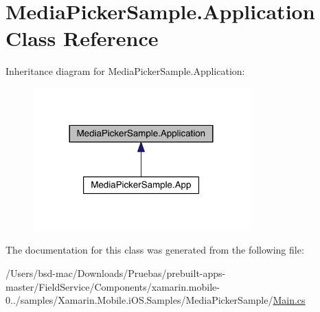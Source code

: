 \hypertarget{class_media_picker_sample_1_1_application}{\section{Media\+Picker\+Sample.\+Application Class Reference}
\label{class_media_picker_sample_1_1_application}
}


Inheritance diagram for Media\+Picker\+Sample.\+Application\+:
\nopagebreak
\begin{figure}[H]
\begin{center}
\leavevmode
\includegraphics[width=236pt]{class_media_picker_sample_1_1_application__inherit__graph}
\end{center}
\end{figure}


The documentation for this class was generated from the following file\+:\begin{DoxyCompactItemize}
\item 
/\+Users/bsd-\/mac/\+Downloads/\+Pruebas/prebuilt-\/apps-\/master/\+Field\+Service/\+Components/xamarin.\+mobile-\/0../samples/\+Xamarin.\+Mobile.\+i\+O\+S.\+Samples/\+Media\+Picker\+Sample/\hyperlink{_components_2xamarin_8mobile-0_86_81_2samples_2_xamarin_8_mobile_8i_o_s_8_samples_2_media_picker_sample_2_main_8cs}{Main.\+cs}\end{DoxyCompactItemize}
